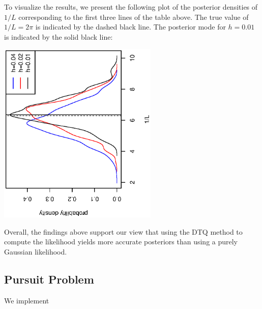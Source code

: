 \documentclass[graybox]{svmult}
\begin{document}
To visualize the results, we present the following plot of the posterior densities of $1/L$ corresponding to the first three lines of the table above.  The true value of $1/L = 2 \pi$ is indicated by the dashed black line.  The posterior mode for $h = 0.01$ is indicated by the solid black line:
\vspace{-0.6in}
\begin{center}
\includegraphics[width=3in,angle=270]{densities.eps}
\end{center}
\vspace{-0.1in}
Overall, the findings above support our view that using the DTQ method to compute the likelihood yields more accurate posteriors than using a purely Gaussian likelihood.


\subsection{Pursuit Problem}
\label{subsec:3-2}
We implement 
\end{document}
